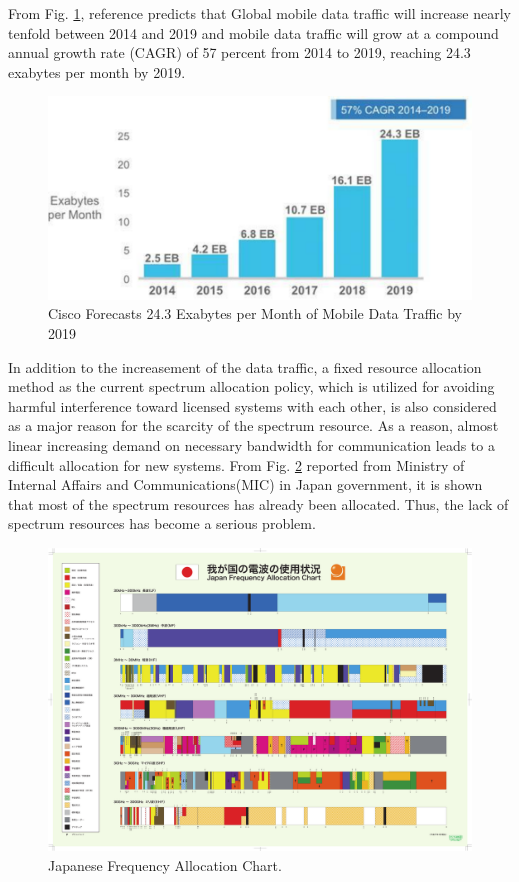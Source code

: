  From Fig. \ref{fig:Cisco}, reference \cite{ref:Cisco} predicts that Global mobile data traffic will increase nearly tenfold between 2014 and 2019 and mobile data traffic will grow at a compound annual growth rate (CAGR) of 57 percent from 2014 to 2019, reaching 24.3 exabytes per month by 2019. 
\begin{figure}[!htp]
\includegraphics[width=150mm,clip]{traffic_trend.pdf}
\caption{Cisco Forecasts 24.3 Exabytes per Month of Mobile Data Traffic by 2019}
\label{fig:Cisco}
\end{figure}
In addition to the increasement of the data traffic, a fixed resource allocation method as the current spectrum allocation policy, which is utilized for avoiding harmful interference toward licensed systems with each other, is also considered as a major reason for the scarcity of the spectrum resource. As a reason, almost linear increasing demand on necessary bandwidth for communication leads to a difficult allocation for new systems. From Fig. \ref{fig:MIC} reported from Ministry of Internal Affairs and Communications(MIC) in Japan government\cite{ref:MIC}, it is shown that most of the spectrum resources has already been allocated. Thus, the lack of spectrum resources has become a serious problem.
\begin{figure}[!htp]
\includegraphics[width=150mm,clip]{frequency_alloc.pdf}
\caption{Japanese Frequency Allocation Chart.}
\label{fig:MIC}
\end{figure}

